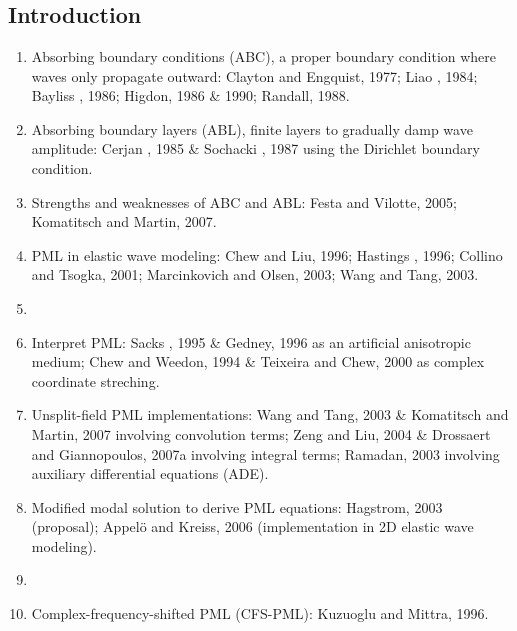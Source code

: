 \renewcommand{\pmk}{ZhangW\_2010\_Geophy\_ADE CFS-PML}
\renewcommand{\prf}{Modelling/\pmk.pdf}
\renewcommand{\pti}{Unsplit complex frequency-shifted PML implementation
using auxiliary differential equations for seismic wave modeling}
\renewcommand{\pay}{Wei Zhang, Yang Shen, 2010}
\renewcommand{\pjo}{Geophysics}
\renewcommand{\pda}{2016/11/6 Sun.}

\section{\pinfo}
\subsection{Introduction}
\begin{enumerate}[\hspace{10mm}*]
  \item Absorbing boundary conditions (ABC), a proper boundary condition
    where waves only propagate outward: Clayton and Engquist, 1977;
    Liao \etal, 1984; Bayliss \etal, 1986; Higdon, 1986 \& 1990; Randall, 1988.
  \item Absorbing boundary layers (ABL), finite layers to
    gradually damp wave amplitude: Cerjan \etal, 1985 \&
    Sochacki \etal, 1987 using the Dirichlet boundary condition.
  \item Strengths and weaknesses of ABC and ABL: Festa and Vilotte, 2005;
    Komatitsch and Martin, 2007.
  \item PML in elastic wave modeling: Chew and Liu, 1996; Hastings \etal, 1996;
    Collino and Tsogka, 2001; Marcinkovich and Olsen, 2003; Wang and Tang, 2003.
  \item \sline
  \item Interpret PML: Sacks \etal, 1995 \& Gedney, 1996 as
    an artificial anisotropic medium; Chew and Weedon, 1994 \&
    Teixeira and Chew, 2000 as complex coordinate streching.
  \item Unsplit-field PML implementations: Wang and Tang, 2003 \&
    Komatitsch and Martin, 2007 involving convolution terms;
    Zeng and Liu, 2004 \& Drossaert and Giannopoulos, 2007a
    involving integral terms;
    Ramadan, 2003 involving auxiliary differential equations (ADE).
  \item Modified modal solution to derive PML equations:
    Hagstrom, 2003 (proposal);
    Appel\"{o} and Kreiss, 2006 (implementation in 2D elastic wave modeling).
  \item \sline
  \item Complex-frequency-shifted PML (CFS-PML): Kuzuoglu and Mittra, 1996.

\end{enumerate}
